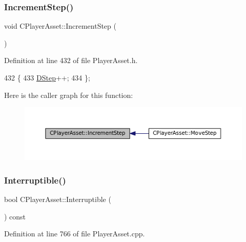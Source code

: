 \subsubsection{\texorpdfstring{Increment\+Step()}{IncrementStep()}}
{\footnotesize\ttfamily void C\+Player\+Asset\+::\+Increment\+Step (\begin{DoxyParamCaption}{ }\end{DoxyParamCaption})\hspace{0.3cm}{\ttfamily [inline]}}



Definition at line 432 of file Player\+Asset.\+h.


\begin{DoxyCode}
432                             \{
433             \hyperlink{classCPlayerAsset_a7964d2161d51b3edd66fbc9c59eba4b0}{DStep}++;    
434         \};
\end{DoxyCode}
Here is the caller graph for this function\+:
\nopagebreak
\begin{figure}[H]
\begin{center}
\leavevmode
\includegraphics[width=350pt]{classCPlayerAsset_aa1d39b408fd5aa11f2c3a19ef4d3895d_icgraph}
\end{center}
\end{figure}
\hypertarget{classCPlayerAsset_a927a79955847918fa2807d37374b4fb6}{}\label{classCPlayerAsset_a927a79955847918fa2807d37374b4fb6} 
\subsubsection{\texorpdfstring{Interruptible()}{Interruptible()}}
{\footnotesize\ttfamily bool C\+Player\+Asset\+::\+Interruptible (\begin{DoxyParamCaption}{ }\end{DoxyParamCaption}) const}



Definition at line 766 of file Player\+Asset.\+cpp.


